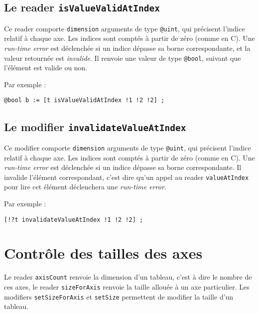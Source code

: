 \subsection{Le reader \lstinline[language=galgas]!isValueValidAtIndex!}

Ce reader comporte \lstinline[language=galgas]!dimension! arguments de type \lstinline[language=galgas]!@uint!, qui précisent l'indice relatif à chaque axe. Les indices sont comptés à partir de zéro (comme en C). Une \emph{run-time error} est déclenchée si un indice dépasse sa borne correspondante, et la valeur retournée est \emph{invalide}. Il renvoie une valeur de type \lstinline[language=galgas]!@bool!, suivant que l'élément est valide ou non.

Par exemple :
\begin{lstlisting}[language=galgas]
  @bool b := [t isValueValidAtIndex !1 !2 !2] ;
\end{lstlisting}


\subsection{Le modifier \lstinline[language=galgas]!invalidateValueAtIndex!}

Ce modifier comporte \lstinline[language=galgas]!dimension! arguments de type \lstinline[language=galgas]!@uint!, qui précisent l'indice relatif à chaque axe. Les indices sont comptés à partir de zéro (comme en C). Une \emph{run-time error} est déclenchée si un indice dépasse sa borne correspondante. Il invalide l'élément correspondant, c'est dire qu'un appel au reader \lstinline[language=galgas]!valueAtIndex! pour lire cet élément déclenchera une \emph{run-time error}.

Par exemple :
\begin{lstlisting}[language=galgas]
  [!?t invalidateValueAtIndex !1 !2 !2] ;
\end{lstlisting}





\section{Contrôle des tailles des axes}

Le reader \lstinline[language=galgas]!axisCount! renvoie la dimension d'un tableau, c'est à dire le nombre de ces axes, le reader \lstinline[language=galgas]!sizeForAxis! renvoie la taille allouée à un axe particulier. Les modifiers \lstinline[language=galgas]!setSizeForAxis! et \lstinline[language=galgas]!setSize! permettent de modifier la taille d'un tableau.



